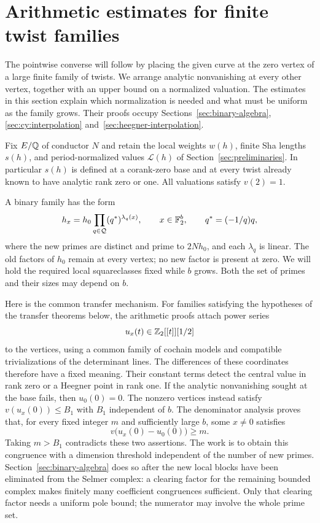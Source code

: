 \section{Arithmetic estimates for finite twist families}
\label{sec:transfer-criteria}

The pointwise converse will follow by placing the given curve at the
zero vertex of a large finite family of twists. We arrange analytic
nonvanishing at every other vertex, together with an upper bound on a
normalized valuation. The estimates in this section explain which
normalization is needed and what must be uniform as the family grows.
Their proofs occupy Sections~\ref{sec:binary-algebra},
\ref{sec:cy:interpolation} and~\ref{sec:heegner-interpolation}.

Fix $E/\mathbb Q$ of conductor $N$ and retain the local weights $w(h)$,
finite Sha lengths $s(h)$, and period-normalized values $\mathcal L(h)$
of Section~\ref{sec:preliminaries}. In particular $s(h)$ is defined at
a corank-zero base and at every twist already known to have analytic
rank zero or one. All valuations satisfy $v(2)=1$.

A binary family has the form
\[
 h_x=h_0\prod_{q\in\mathcal Q}(q^*)^{\lambda_q(x)},
 \qquad x\in\mathbb F_2^b,\qquad q^*=(-1/q)q,
\]
where the new primes are distinct and prime to $2Nh_0$, and each
$\lambda_q$ is linear. The old factors of $h_0$ remain at every vertex;
no new factor is present at zero. We will hold the required local
squareclasses fixed while $b$ grows. Both the set of primes and their
sizes may depend on $b$.

Here is the common transfer mechanism. For families satisfying the
hypotheses of the transfer theorems below, the arithmetic proofs attach
power series
\[
                 u_x(t)\in\mathbb Z_2[[t]][1/2]
\]
to the vertices, using a common family of cochain models and compatible
trivializations of the determinant lines. The differences of these
coordinates therefore have a fixed meaning. Their constant terms detect
the central value in rank zero or a Heegner point in rank one. If the analytic nonvanishing sought
at the base fails, then $u_0(0)=0$. The nonzero vertices instead satisfy
$v(u_x(0))\le B_1$ with $B_1$ independent of $b$.
The denominator analysis proves that, for every fixed integer $m$ and
sufficiently large $b$, some $x\ne0$ satisfies
\[
                   v\bigl(u_x(0)-u_0(0)\bigr)\ge m.
\]
Taking $m>B_1$ contradicts these two assertions. The work is to obtain
this congruence with a dimension threshold independent of the number
of new primes. Section~\ref{sec:binary-algebra} does so after the new
local blocks have been eliminated from the Selmer complex: a clearing
factor for the remaining bounded complex makes finitely many coefficient
congruences sufficient. Only that clearing factor needs a uniform pole
bound; the numerator may involve the whole prime set.

